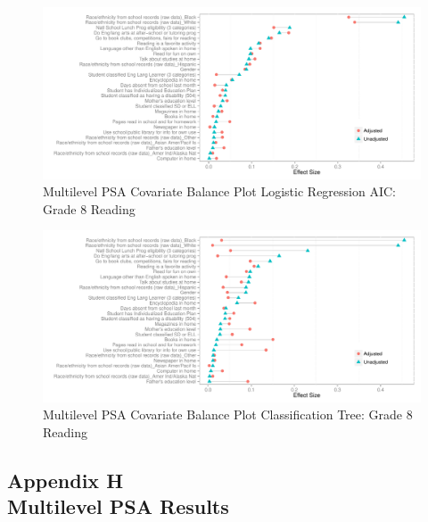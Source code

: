 \documentclass[letterpaper,12p,twoside]{article} %
\begin{document}
\begin{figure}[h!]
\begin{center}
\includegraphics[width=\textwidth]{../Figures2009/g8read-mlpsa-lrAIC-balance.pdf}
\caption{Multilevel PSA Covariate Balance Plot Logistic Regression AIC: Grade 8 Reading}
\end{center}
\end{figure}

\begin{figure}[h!]
\begin{center}
\includegraphics[width=\textwidth]{../Figures2009/g8read-mlpsa-ctree-balance.pdf}
\caption{Multilevel PSA Covariate Balance Plot Classification Tree: Grade 8 Reading}
\end{center}
\end{figure}


\clearpage
{}
\subsection*{Appendix H\\Multilevel PSA Results}
\end{document}
